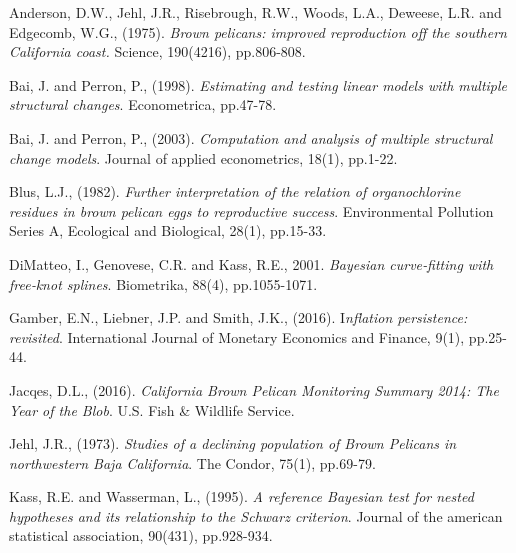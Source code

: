 \documentclass[submit]{smj}
\begin{document}
\begin{thebibliography}{99}

Anderson, D.W., Jehl, J.R., Risebrough, R.W., Woods, L.A., Deweese, L.R. and Edgecomb, W.G., (1975). 
\textit{Brown pelicans: improved reproduction off the southern California coast.} Science, 190(4216), pp.806-808.

Bai, J. and Perron, P., (1998).
\textit{Estimating and testing linear models with multiple structural changes}.
Econometrica, pp.47-78.

Bai, J. and Perron, P., (2003).
\textit{ Computation and analysis of multiple structural change models}.
Journal of applied econometrics, 18(1), pp.1-22.

Blus, L.J., (1982). 
\textit{Further interpretation of the relation of organochlorine residues in brown pelican eggs to reproductive success}. 
Environmental Pollution Series A, Ecological and Biological, 28(1), pp.15-33.


DiMatteo, I., Genovese, C.R. and Kass, R.E., 2001. 
\textit{Bayesian curve‐fitting with free‐knot splines}. 
Biometrika, 88(4), pp.1055-1071.

Gamber, E.N., Liebner, J.P. and Smith, J.K., (2016). 
I\textit{nflation persistence: revisited}. 
International Journal of Monetary Economics and Finance, 9(1), pp.25-44.

Jacqes, D.L., (2016). 
\textit{California Brown Pelican Monitoring Summary 2014: The Year of the Blob}. 
U.S. Fish \& Wildlife Service.

Jehl, J.R., (1973). 
\textit{Studies of a declining population of Brown Pelicans in northwestern Baja California}. 
The Condor, 75(1), pp.69-79.

Kass, R.E. and Wasserman, L., (1995). 
\textit{A reference Bayesian test for nested hypotheses and its relationship to the Schwarz criterion}. 
Journal of the american statistical association, 90(431), pp.928-934.


\end{thebibliography}
\end{document}
